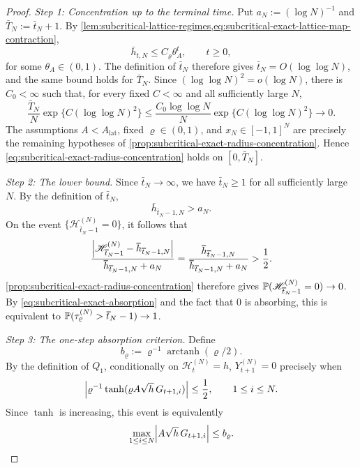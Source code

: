 \documentclass[11pt,reqno,a4paper]{article}
\newcommand{\Pp}{\P}
\DeclareMathOperator{\arctanh}{arctanh}
\begin{document}
\begin{proof}
  \emph{Step 1: Concentration up to the terminal time.}
  Put $a_N:=(\log N)^{-1}$ and $\bar T_N:=\bar t_N+1$.
  By \cref{lem:subcritical-lattice-regimes,eq:subcritical-exact-lattice-map-contraction},
  \begin{equation*}
    \bar h_{t,N}\leq C_\varrho\theta_A^t,
    \qquad t\geq0,
  \end{equation*}
  for some $\theta_A\in(0,1)$. The definition of $\bar t_N$ therefore gives
  $\bar t_N=O(\log\log N)$, and the same bound holds for $\bar T_N$. Since
  $(\log\log N)^2=o(\log N)$, there is $C_0<\infty$ such that, for every
  fixed $C<\infty$ and all sufficiently large $N$,
  \begin{equation*}
    \frac{\bar T_N}{N}\exp\{C(\log\log N)^2\}
    \leq
    \frac{C_0\log\log N}{N}\exp\{C(\log\log N)^2\}
    \longrightarrow0.
  \end{equation*}
  The assumptions
  $A<A_{\mathrm{lat}}$, fixed $\varrho\in(0,1)$, and
  $x_N\in[-1,1]^N$ are precisely the remaining hypotheses of
  \cref{prop:subcritical-exact-radius-concentration}. Hence
  \cref{eq:subcritical-exact-radius-concentration} holds on
  $[0,\bar T_N]$.

  \emph{Step 2: The lower bound.}
  Since $\bar t_N\to\infty$, we have
  $\bar t_N\geq1$ for all sufficiently large $N$. By the definition of
  $\bar t_N$,
  \begin{equation*}
    \bar h_{\bar t_N-1,N}>a_N .
  \end{equation*}
  On the event $\{\mathscr H_{\bar t_N-1}^{(N)}=0\}$, it follows that
  \begin{equation*}
    \frac{
      \abs{\mathscr H_{\bar t_N-1}^{(N)}-\bar h_{\bar t_N-1,N}}
    }{
      \bar h_{\bar t_N-1,N}+a_N
    }
    =
    \frac{\bar h_{\bar t_N-1,N}}{\bar h_{\bar t_N-1,N}+a_N}
    >
    \frac12 .
  \end{equation*}
  \cref{prop:subcritical-exact-radius-concentration} therefore gives
  $\Pp(\mathscr H_{\bar t_N-1}^{(N)}=0)\to0$. By
  \cref{eq:subcritical-exact-absorption} and the fact that $0$ is absorbing,
  this is equivalent to
  $\Pp(\tau_{\varrho}^{(N)}>\bar t_N-1)\to1$.

  \emph{Step 3: The one-step absorption criterion.}
  Define
  \begin{equation}\label{eq:subcritical-exact-round-to-zero-threshold}
    b_\varrho:=\varrho^{-1}\arctanh(\varrho/2).
  \end{equation}
  By the definition of $Q_1$, conditionally on $\mathscr H_t^{(N)}=h$,
  $Y_{t+1}^{(N)}=0$ precisely when
  \begin{equation*}
    \abs{
      \varrho^{-1}\tanh(\varrho A\sqrt h\,G_{t+1,i})
    }
    \leq\frac12,
    \qquad 1\leq i\leq N.
  \end{equation*}
  Since $\tanh$ is increasing, this event is equivalently
  \begin{equation}\label{eq:subcritical-exact-round-to-zero}
    \max_{1\leq i\leq N}\abs{A\sqrt h\,G_{t+1,i}}
    \leq b_\varrho .
  \end{equation}


\end{proof}
\end{document}
